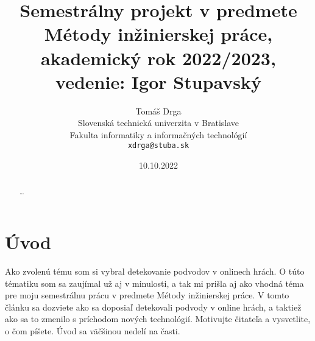 \documentclass[10pt,twoside,slovak,a4paper]{article}
\title{Semestrálny projekt v predmete Métody inžinierskej práce, akademický rok 2022/2023, vedenie: Igor Stupavský}
\author{Tomáš Drga\\[2pt]
	{\small Slovenská technická univerzita v Bratislave}\\
	{\small Fakulta informatiky a informačných technológií}\\
	{\small \texttt{xdrga@stuba.sk}}
	}
\date{\small 10.10.2022}
\begin{document}
\maketitle

\begin{abstract}
\ldots
\end{abstract}

\section{Úvod}

Ako zvolenú tému som si vybral detekovanie podvodov v onlinech hrách. O túto tématiku som sa zaujímal už aj v minulosti, a tak mi prišla aj ako vhodná téma pre moju semestrálnu prácu v predmete Métody inžinierskej práce. V tomto článku sa dozviete ako sa doposiaľ detekovali podvody v online hrách, a taktiež ako sa to zmenilo s príchodom nových technológií.
Motivujte čitateľa a vysvetlite, o čom píšete. Úvod sa väčšinou nedelí na časti.
\end{document}

